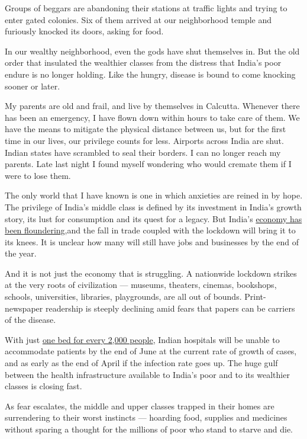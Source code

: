 Groups of beggars are abandoning their stations at traffic lights and
trying to enter gated colonies. Six of them arrived at our neighborhood
temple and furiously knocked its doors, asking for food.

In our wealthy neighborhood, even the gods have shut themselves in. But
the old order that insulated the wealthier classes from the distress
that India's poor endure is no longer holding. Like the hungry, disease
is bound to come knocking sooner or later.

My parents are old and frail, and live by themselves in Calcutta.
Whenever there has been an emergency, I have flown down within hours to
take care of them. We have the means to mitigate the physical distance
between us, but for the first time in our lives, our privilege counts
for less. Airports across India are shut. Indian states have scrambled
to seal their borders. I can no longer reach my parents. Late last night
I found myself wondering who would cremate them if I were to lose them.

The only world that I have known is one in which anxieties are reined in
by hope. The privilege of India's middle class is defined by its
investment in India's growth story, its lust for consumption and its
quest for a legacy. But India's
\href{https://www.bloomberg.com/news/features/2020-01-29/india-s-worst-economic-slowdown-in-a-decade}{economy
has been floundering,}and the fall in trade coupled with the lockdown
will bring it to its knees. It is unclear how many will still have jobs
and businesses by the end of the year.

And it is not just the economy that is struggling. A nationwide lockdown
strikes at the very roots of civilization --- museums, theaters,
cinemas, bookshops, schools, universities, libraries, playgrounds, are
all out of bounds. Print-newspaper readership is steeply declining amid
fears that papers can be carriers of the disease.

With just
\href{https://theprint.in/opinion/current-rate-india-30000-covid-19-deaths-may-no-hospital-bed-june-data/385386/}{one
bed for every 2,000 people}, Indian hospitals will be unable to
accommodate patients by the end of June at the current rate of growth of
cases, and as early as the end of April if the infection rate goes up.
The huge gulf between the health infrastructure available to India's
poor and to its wealthier classes is closing fast.

As fear escalates, the middle and upper classes trapped in their homes
are surrendering to their worst instincts --- hoarding food, supplies
and medicines without sparing a thought for the millions of poor who
stand to starve and die.

